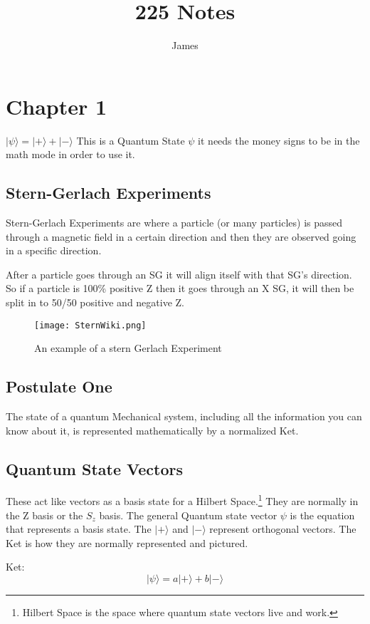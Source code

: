 \documentclass[twocolumn]{article}
\title{225 Notes}
\author{James}
\begin{document}
\maketitle
\tableofcontents{}
\section{Chapter 1}

$|\psi\rangle=|+\rangle + |-\rangle$ This is a Quantum State $\psi$ it needs the money signs to be in the math mode in order to use it. 

\subsection{Stern-Gerlach Experiments}
Stern-Gerlach Experiments are where a particle (or many particles) is passed through a magnetic field in a certain direction and then they are observed going in a specific direction. 

After a particle goes through an SG it will align itself with that SG's direction. So if a particle is 100\% positive Z then it goes through an X SG, it will then be split in to 50/50 positive and negative Z. 

\begin{figure}[htp]
\centering
\texttt{[image: SternWiki.png]}
\caption{An example of a stern Gerlach Experiment}
\label{fig:lion}
\end{figure}

\subsection{Postulate One}
The state of a quantum Mechanical system, including all the information you can know about it, is represented mathematically by a normalized Ket.

\subsection{Quantum State Vectors}

These act like vectors as a basis state for a Hilbert Space.\footnote{Hilbert Space is the space where quantum state vectors live and work.} They are normally in the Z basis or the $S_z$ basis. The general Quantum state vector $\psi$ is the equation that represents a basis state. The $|+\rangle$ and $|-\rangle$ represent orthogonal vectors. The Ket is how they are normally represented and pictured. 

Ket:
\begin{equation}\label{bra}
    |\psi\rangle=a|+\rangle+b|-\rangle
\end{equation}
\end{document}
